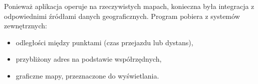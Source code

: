 Ponieważ aplikacja operuje na rzeczywistych mapach, konieczna była integracja z odpowiednimi źródłami danych geograficznych. Program pobiera z systemów zewnętrznych:
\begin{itemize}
	\item odległości między punktami (czas przejazdu lub dystans),
	\item przybliżony adres na podstawie współrzędnych,
	\item graficzne mapy, przeznaczone do wyświetlania.
\end{itemize}
